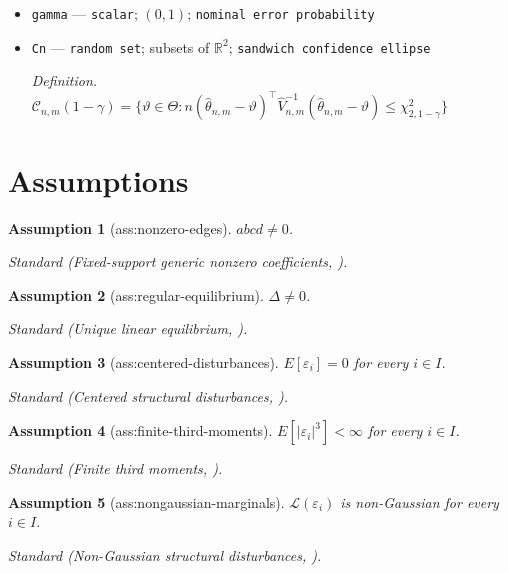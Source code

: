 \documentclass{article}
\newtheorem{assumption}{Assumption}
\begin{document}
\begin{itemize}
  \par\smallskip\noindent\emph{Definition.} \(\widehat V_{n,m}=(\widehat J_{n,m}^\top\widehat S_{n,m}^{-1}\widehat J_{n,m})^{-1}\)
  \item \texttt{gamma} --- \texttt{scalar}; \((0,1)\); \texttt{nominal error probability}
  \item \texttt{Cn} --- \texttt{random set}; subsets of \(\mathbb R^2\); \texttt{sandwich confidence ellipse}
  \par\smallskip\noindent\emph{Definition.} \(\mathcal C_{n,m}(1-\gamma)=\{\vartheta\in\Theta:n(\widehat\theta_{n,m}-\vartheta)^\top\widehat V_{n,m}^{-1}(\widehat\theta_{n,m}-\vartheta)\le\chi^2_{2,1-\gamma}\}\)
\end{itemize}

\section{Assumptions}

\begin{assumption}[ass:nonzero-edges]\label{ass:nonzero-edges}
\(abcd\neq0\).
\par\smallskip\noindent\emph{Standard} (Fixed-support generic nonzero coefficients, \cite{TramontanoDrtonEtesami2026}).
\end{assumption}

\begin{assumption}[ass:regular-equilibrium]\label{ass:regular-equilibrium}
\(\Delta\neq0\).
\par\smallskip\noindent\emph{Standard} (Unique linear equilibrium, \cite{TramontanoDrtonEtesami2026}).
\end{assumption}

\begin{assumption}[ass:centered-disturbances]\label{ass:centered-disturbances}
\(E[\varepsilon_i]=0\) for every \(i\in I\).
\par\smallskip\noindent\emph{Standard} (Centered structural disturbances, \cite{TramontanoDrtonEtesami2026}).
\end{assumption}

\begin{assumption}[ass:finite-third-moments]\label{ass:finite-third-moments}
\(E[|\varepsilon_i|^3]<\infty\) for every \(i\in I\).
\par\smallskip\noindent\emph{Standard} (Finite third moments, \cite{TramontanoDrtonEtesami2026}).
\end{assumption}

\begin{assumption}[ass:nongaussian-marginals]\label{ass:nongaussian-marginals}
\(\mathcal L(\varepsilon_i)\) is non-Gaussian for every \(i\in I\).
\par\smallskip\noindent\emph{Standard} (Non-Gaussian structural disturbances, \cite{TramontanoDrtonEtesami2026}).
\end{assumption}
\end{document}
